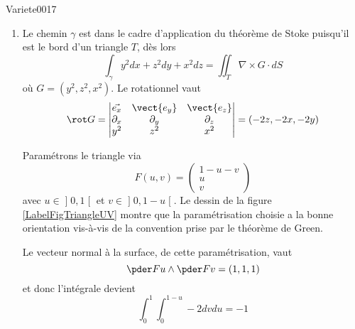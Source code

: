 
\begin{corrige}{Variete0017}


	\begin{enumerate}

		\item

			Le chemin $\gamma$ est dans le cadre d'application du théorème de Stoke puisqu'il est le bord d'un triangle $T$, dès lors
			\begin{equation*}
				\int_{\gamma} y^2 d x + z^2 d y + x^2 d z = \iint_T \nabla\times G \cdot dS
			\end{equation*}
			où $G = (y^2, z^2, x^2)$. Le rotationnel vaut
			\begin{equation*}
				\rot G =
				\begin{vmatrix}
                    \vec{e_x} & \vect{e_y} & \vect{e_z}\\
					\partial_x & \partial_y & \partial_z \\
					y^2 & z^2 & x^2
				\end{vmatrix}
				= (-2 z, -2 x, - 2 y)
			\end{equation*}

			Paramétrons le triangle via
			\begin{equation}
				F(u,v)=\begin{pmatrix}
					1-u-v	\\ 
					u	\\ 
					v	
				\end{pmatrix}
			\end{equation}
			avec $u\in\mathopen] 0 , 1 \mathclose[$ et $v\in\mathopen] 0 , 1-u \mathclose[$. Le dessin de la figure \ref{LabelFigTriangleUV} montre que la paramétrisation choisie a la bonne orientation vis-à-vis de la convention prise par le théorème de Green.
			\newcommand{\CaptionFigTriangleUV}{Question d'orientation. La base $(\nu,T)$ a la même orientation que la base $(1_u,1_v)$. Cela fait que la carte choisie est de bonne orientation.}
			

			Le vecteur normal à la surface, de cette paramétrisation, vaut
			\begin{equation*}
				\pder F u \wedge \pder F v = (1,1,1)
			\end{equation*}
			et donc l'intégrale devient
			\begin{equation*}
				\int_0^1 \int_0^{1-u} -2 d v d u = -1
			\end{equation*}


\end{enumerate}
\end{corrige}
